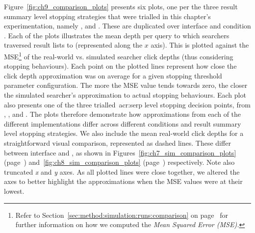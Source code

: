 Figure~\ref{fig:ch9_comparison_plots} presents six plots, one per the three result summary level stopping strategies that were trialled in this chapter's experimentation, namely ,  and . These are duplicated over interface  and condition . Each of the plots illustrates the mean depth per query to which searchers traversed result lists to (represented along the $x$ axis). This is plotted against the MSE\footnote{Refer to Section~\ref{sec:method:simulation:runs:comparison} on page~\pageref{sec:method:simulation:runs:comparison} for further information on how we computed the \emph{Mean Squared Error (MSE).}} of the real-world vs. simulated searcher click depths (thus considering stopping behaviours). Each point on the plotted lines represent how close the click depth approximation was on average for a given stopping threshold parameter configuration. The more the MSE value tends towards zero, the closer the simulated searcher's approximation to actual stopping behaviours. Each plot also presents one of the three trialled~\gls{acr:serp} level stopping decision points, from , , and . The plots therefore demonstrate how approximations from each of the different implementations differ across different conditions and result summary level stopping strategies. We also include the mean real-world click depths for a straightforward visual comparison, represented as dashed lines. These differ between interface  and , as shown in Figures~\ref{fig:ch7_sim_comparison_plots} (page~\pageref{fig:ch7_sim_comparison_plots}) and~\ref{fig:ch8_sim_comparison_plots} (page~\pageref{fig:ch8_sim_comparison_plots}) respectively. Note also truncated \emph{x} and \emph{y} axes. As all plotted lines were close together, we altered the axes to better highlight the approximations when the MSE values were at their lowest.

